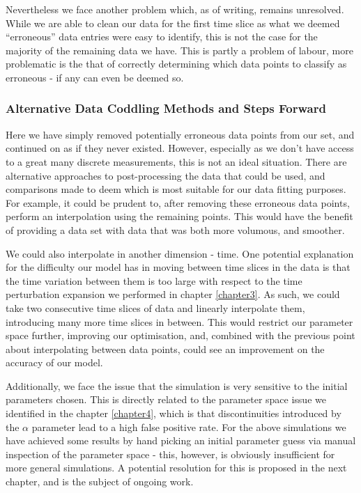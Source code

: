 Nevertheless we face another problem which, as of writing, remains unresolved. While we are able to clean our data 
for the first time slice as what we deemed ``erroneous'' data entries were easy to identify, this is not the case for the majority 
of the remaining data we have. This is partly a problem of labour, more problematic is the that of correctly determining which 
data points to classify as erroneous - if any can even be deemed so.



\subsubsection{Alternative Data Coddling Methods and Steps Forward}
Here we have simply removed potentially erroneous data points from our set, and continued on as if they never existed. 
However, especially as we don't have access to a great many discrete measurements, this is not an ideal situation. 
There are alternative approaches to post-processing the data that could be used, and comparisons made to deem which is 
most suitable for our data fitting purposes. For example, it could be prudent to, after removing these erroneous data points, 
perform an interpolation using the remaining points. This would have the benefit of providing a data set with data that was both 
more volumous, and smoother.

We could also interpolate in another dimension - time. One potential explanation for the difficulty our model has in moving between 
time slices in the data is that the time variation between them is too large with respect to the time perturbation expansion we performed 
in chapter \ref{chapter3}. As such, we could take two consecutive time slices of data and linearly interpolate them, introducing 
many more time slices in between. This would restrict our parameter space further, improving our optimisation, and, combined with 
the previous point about interpolating between data points, could see an improvement on the accuracy of our model.

Additionally, we face the issue that the simulation is very sensitive to the initial parameters chosen. This is directly related 
to the parameter space issue we identified in the chapter \ref{chapter4}, which is that discontinuities introduced by the $\alpha$ 
parameter lead to a high false positive rate. For the above simulations we have achieved some 
results by hand picking an initial parameter guess via manual inspection of the parameter space - this, however, is obviously insufficient 
for more general simulations. A potential resolution for this is proposed in the next chapter, and is the subject of ongoing work.